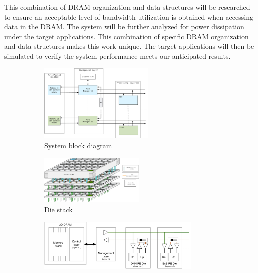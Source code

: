 This combination of DRAM organization and data structures will be researched to ensure an acceptable level of bandwidth utilization
is obtained when accessing data in the DRAM.
The system will be further analyzed for power dissipation under the target applications.
This combination of specific DRAM organization and data structures makes this work unique.
The target applications will then be simulated to verify the system performance meets our anticipated results.

\begin{figure}
\centering
\captionsetup{justification=centering}
\vspace{0.5cm}
\begin{subfigure}{.7\textwidth}
  \centering
  \includegraphics[width=0.60\textwidth]{Chapter-4/figs/BlockDiagram}
  \caption{System block diagram}
  \label{fig:blockDiagram}
\end{subfigure}%
\vspace{0.25cm}
\begin{subfigure}{.8\textwidth}
  \centering
  \includegraphics[width=0.55\textwidth]{Chapter-4/figs/DieStack}
  \caption{Die stack}
  \label{fig:dieStack}
\end{subfigure}
\vspace{0.25cm}
\begin{subfigure}{.9\textwidth}
  \centering
  \includegraphics[width=0.85\textwidth]{Chapter-4/figs/StackBus}

\end{subfigure}
\end{figure}
